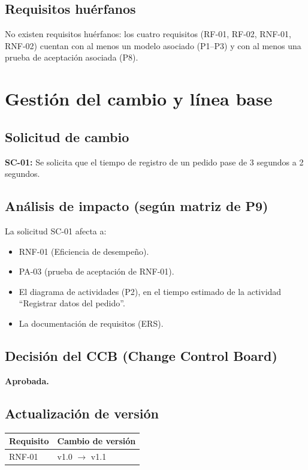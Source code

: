 \documentclass[11pt,a4paper]{article}
\begin{document}
\subsection*{Requisitos huérfanos}
No existen requisitos huérfanos: los cuatro requisitos (RF-01, RF-02, RNF-01,
RNF-02) cuentan con al menos un modelo asociado (P1--P3) y con al menos una prueba
de aceptación asociada (P8).

\newpage
\section{Gestión del cambio y línea base}
\label{sec:p10}

\subsection*{Solicitud de cambio}
\textbf{SC-01:} Se solicita que el tiempo de registro de un pedido pase de 3
segundos a 2 segundos.

\subsection*{Análisis de impacto (según matriz de P9)}
La solicitud SC-01 afecta a:
\begin{itemize}[leftmargin=1.4cm]
\item RNF-01 (Eficiencia de desempeño).
\item PA-03 (prueba de aceptación de RNF-01).
\item El diagrama de actividades (P2), en el tiempo estimado de la actividad
      ``Registrar datos del pedido''.
\item La documentación de requisitos (ERS).
\end{itemize}

\subsection*{Decisión del CCB (Change Control Board)}
\textbf{Aprobada.} \checkmark

\subsection*{Actualización de versión}
\begin{center}
\begin{tabular}{ll}
\toprule
Requisito & Cambio de versión \\
\midrule
RNF-01 & v1.0 $\rightarrow$ v1.1 \\
\bottomrule
\end{tabular}
\end{center}
\end{document}
